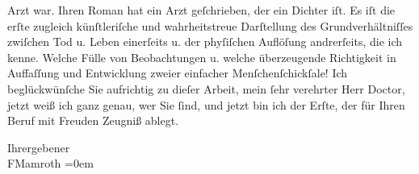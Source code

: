                Arzt war. Ihren Roman hat ein Arzt geſchrieben, der ein Dichter iſt. Es iſt die erſte
               zugleich künſtleriſche und wahrheitstreue Darſtellung des Grundverhältniſſes zwiſchen
               Tod u. Leben einerſeits u. der phyſiſchen Auflöſung andrerſeits, die ich kenne.
               Welche Fülle von Beobachtungen u. welche überzeugende Richtigkeit in Auffaſſung und
               Entwicklung zweier einfacher Menſchenſchickſale! Ich beglückwünſche Sie aufrichtig zu
               dieſer Arbeit, mein{ }ſehr verehrter Herr Doctor, jetzt weiß ich ganz genau, wer Sie{ }ſind, und jetzt bin ich der Erſte, der für Ihren Beruf mit Freuden Zeugniß
               ablegt.\pend
           
\pstart
           Ihr\hspace*{1.5em}ergebener{\\[\baselineskip]}\spacefill\mbox{FMamroth}\pend
           \leftskip=0em{}\endnumbering{}  \newcommand{\dateiname}{L00186}\newcommand{\titel}{Fedor Mamroth an Arthur Schnitzler, 5. 3. 1893}\newcommand{\editorInnen}{Martin Anton Müller und Gerd-Hermann Susen}
